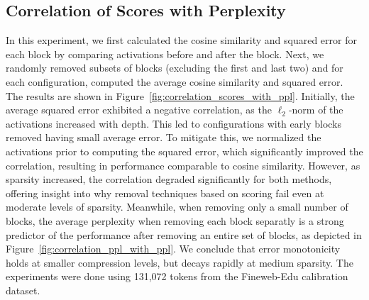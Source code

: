 

\FloatBarrier

\subsection{Correlation of Scores with Perplexity}
In this experiment, we first calculated the cosine similarity and squared error for each block by comparing activations before and after the block. Next, we randomly removed subsets of blocks (excluding the first and last two) and for each configuration, computed the average cosine similarity and squared error. The results are shown in Figure~\ref{fig:correlation_scores_with_ppl}. Initially, the average squared error exhibited a negative correlation, as the $\ell_2$-norm of the activations increased with depth. This led to configurations with early blocks removed having small average error. To mitigate this, we normalized the activations prior to computing the squared error, which significantly improved the correlation, resulting in performance comparable to cosine similarity. However, as sparsity increased, the correlation degraded significantly for both methods, offering insight into why removal techniques based on scoring fail even at moderate levels of sparsity. Meanwhile, when removing only a small number of blocks, the average perplexity when removing each block separatly is a strong predictor of the performance after removing an entire set of blocks, as depicted in Figure~\ref{fig:correlation_ppl_with_ppl}. We conclude that error monotonicity holds at smaller compression levels, but decays rapidly at medium sparsity. The experiments were done using 131,072 tokens from the Fineweb-Edu calibration dataset.

